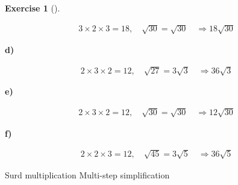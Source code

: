 \documentclass[
  letterpaper,
  DIV=11,
  numbers=noendperiod]{scrreprt}
\theoremstyle{definition}
\newtheorem{exercise}{Exercise}[chapter]
\theoremstyle{remark}
\begin{document}
\begin{exercise}[]
\begin{tcolorbox}
\[
\begin{aligned}
3\times 2\times 3=18,\quad\sqrt{30}=\sqrt{30}\quad\Rightarrow18\sqrt{30}
\end{aligned}
\]

\textbf{d)}

\[
\begin{aligned}
2\times 3\times 2=12,\quad\sqrt{27}=3\sqrt{3}\quad\Rightarrow36\sqrt{3}
\end{aligned}
\]

\textbf{e)}

\[
\begin{aligned}
2\times 3\times 2=12,\quad\sqrt{30}=\sqrt{30}\quad\Rightarrow12\sqrt{30}
\end{aligned}
\]

\textbf{f)}

\[
\begin{aligned}
2\times 2\times 3=12,\quad\sqrt{45}=3\sqrt{5}\quad\Rightarrow36\sqrt{5}
\end{aligned}
\]

\end{tcolorbox}

{Surd multiplication} {Multi-step simplification}

\end{exercise}
\end{document}
